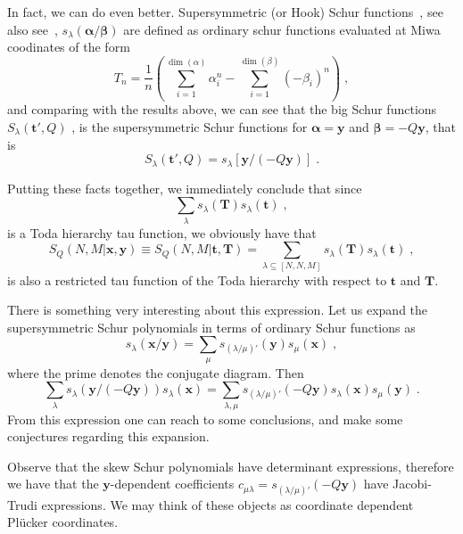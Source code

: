 \documentclass[a4paper,11pt]{amsart}
\begin{document}
In fact, we can do even better. Supersymmetric (or Hook) Schur
functions~\cite{Berele:1983}, see also see~\cite{Macdonald:1998, Moens:2003},
\(s_\lambda(\bm{\alpha}/\bm{\beta})\) are defined as ordinary schur
functions evaluated at Miwa coodinates of the form
\begin{equation}
  T_n = \frac{1}{n} \left( \sum_{i=1}^{\dim(\alpha)} \alpha_i^n
       - \sum_{i=1}^{\dim(\beta)} (-\beta_i)^n\right)\; ,
\end{equation}
and comparing with the results above, we can see that the big Schur functions
\(S_\lambda(\bm{t}', Q)\)\; , is the supersymmetric Schur functions for \(\bm{\alpha} = \bm{y}\) 
and \(\bm{\beta} = - Q \bm{y}\), that is 
\begin{equation}
  S_\lambda(\bm{t}', Q) = s_\lambda[\bm{y}/(- Q\bm{y})]\; .
\end{equation}

Putting these facts together, we immediately conclude that since 
\begin{equation}
  \sum_\lambda s_\lambda(\bm{T}) s_\lambda (\bm{t}) \; ,
\end{equation}
is a Toda hierarchy tau function, we obviously have that 
\begin{equation}
  S_Q(N,M| \bm{x}, \bm{y}) \equiv S_Q(N,M| \bm{t}, \bm{T})
  = \sum_{\lambda \subseteq [N,N,M]} s_\lambda(\bm{T}) s_\lambda(\bm{t})\; , 
\end{equation}
is also a restricted tau function of the Toda hierarchy with respect
to \(\bm{t}\) and \(\bm{T}\).

There is something very interesting about this expression. Let us
expand the supersymmetric Schur polynomials in terms of ordinary Schur
functions as~\cite[Sec. I.5, exerc. 23]{Macdonald:1998}
\begin{equation}
  s_{\lambda}(\bm{x}/\bm{y}) = \sum_\mu s_{(\lambda/\mu)'}(\bm{y}) s_\mu(\bm{x})\; ,
\end{equation}
where the prime denotes the conjugate diagram. Then
\begin{equation}
  \label{eq:tau-hl}
  \sum_{\lambda } s_\lambda(\bm{y}/ (- Q\bm{y})) s_\lambda(\bm{x}) =
  \sum_{\lambda,\mu } s_{(\lambda/\mu)'}(- Q\bm{y}) s_\lambda(\bm{x}) s_\mu(\bm{y})\; .
\end{equation}
From this expression one can reach to some conclusions, and make some 
conjectures regarding this expansion. 

\begin{remark}
Observe that the skew Schur polynomials have
determinant expressions, therefore we have that the
\(\bm{y}\)-dependent coefficients \(c_{\mu \lambda} = s_{(\lambda/\mu)'}(-Q\bm{y})\)
 have Jacobi-Trudi expressions. We may think of these objects as coordinate dependent 
Pl\"ucker coordinates. 
\end{remark}
\end{document}
